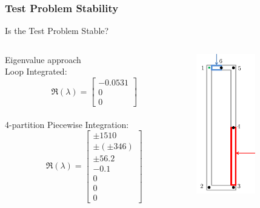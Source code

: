 \documentclass[10pt,t,xcolor=table]{beamer}
\begin{document}
    \subsubsection*{Test Problem Stability}
    \begin{frame}{Is the Test Problem Stable?}
            \begin{columns}[T]
                \begin{column}[T]{0.85\textwidth}
                    Eigenvalue approach\\[0.50em]
                    Loop Integrated:
                    \begin{equation}
                       \Re(\lambda) =   \begin{bmatrix} 
                                            -0.0531     \\
                                            0 \\
                                            0
                                        \end{bmatrix}
                    \end{equation}\\[0.50em]
                    4-partition Piecewise Integration:
                    \begin{equation}
                        \Re(\lambda) =   \begin{bmatrix} 
                                            \pm 1510        \\
                                            \pm(\pm 346)    \\
                                            \pm 56.2        \\
                                            -0.1            \\
                                            0               \\
                                            0               \\
                                            0
                                        \end{bmatrix}
                    \end{equation}
                \end{column}
                \hspace{1em}
                \begin{column}[T]{0.24\textwidth}
                    \includegraphics[height=2.4in]{SimpleNatCirc}
                \end{column}
            \end{columns}
    \end{frame}
    
\end{document}
